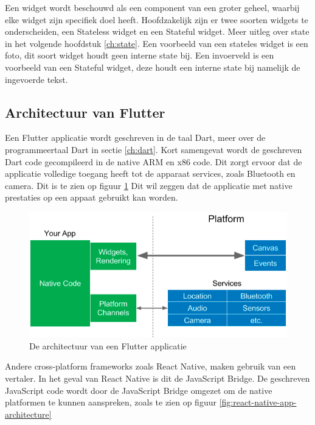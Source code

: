 Een widget wordt beschouwd als een component van een groter geheel, waarbij elke widget zijn specifiek doel heeft.
Hoofdzakelijk zijn er twee soorten widgets te onderscheiden, een Stateless widget en een Stateful widget. Meer uitleg over state in het volgende hoofdstuk \ref{ch:state}. Een voorbeeld van een stateles widget is een foto, dit soort widget houdt geen interne state bij. Een invoerveld is een voorbeeld van een Stateful widget, deze houdt een interne state bij namelijk de ingevoerde tekst. 
\newline

\subsection{Architectuur van Flutter}
Een Flutter applicatie wordt geschreven in de taal Dart, meer over de programmeertaal Dart in sectie \ref{ch:dart}. Kort samengevat wordt de geschreven Dart code gecompileerd in de native ARM en x86 code. 
Dit zorgt ervoor dat de applicatie volledige toegang heeft tot de apparaat services, zoals Bluetooth en camera. Dit is te zien op figuur \ref{fig:flutter-app-architecture}
Dit wil zeggen dat de applicatie met native prestaties op een appaat gebruikt kan worden.

\begin{figure}[H]
    \centering
    \includegraphics[width=\figureWidthModifier\linewidth]{img/stand-van-zaken/flutter-app-architecture.png}
    \caption{De architectuur van een Flutter applicatie \textcite{Leler2017}}
    \label{fig:flutter-app-architecture}
\end{figure}

Andere cross-platform frameworks zoals React Native, maken gebruik van een vertaler. In het geval van React Native is dit de JavaScript Bridge. De geschreven JavaScript code wordt door de JavaScript Bridge omgezet om de native platformen te kunnen aanspreken, zoals te zien op figuur \ref{fig:react-native-app-architecture}  \autocite{Kuitunen2019}

